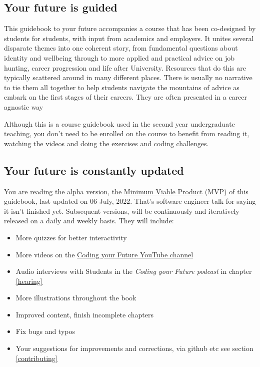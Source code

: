 \documentclass[
]{book}
\providecommand{\tightlist}{%
  \setlength{\itemsep}{0pt}\setlength{\parskip}{0pt}}
\begin{document}
\hypertarget{study}{%
\subsection{Your future is guided}\label{study}}

This guidebook to your future accompanies a course that has been co-designed by students for students, with input from academics and employers. It unites several disparate themes into one coherent story, from fundamental questions about identity and wellbeing through to more applied and practical advice on job hunting, career progression and life after University. Resources that do this are typically scattered around in many different places. There is usually no narrative to tie them all together to help students navigate the mountains of advice as embark on the first stages of their careers. They are often presented in a career agnostic way

Although this is a course guidebook used in the second year undergraduate teaching, you don't need to be enrolled on the course to benefit from reading it, watching the videos and doing the exercises and coding challenges.

\hypertarget{version}{%
\subsection{Your future is constantly updated}\label{version}}

You are reading the alpha version, the \href{https://en.wikipedia.org/wiki/Minimum_viable_product}{Minimum Viable Product} (MVP) of this guidebook, last updated on 06 July, 2022. That's software engineer talk for saying it isn't finished yet. Subsequent versions, will be continuously and iteratively released on a daily and weekly basis. They will include:

\begin{itemize}
\tightlist
\item
  More quizzes for better interactivity
\item
  More videos on the \href{https://www.youtube.com/channel/UCLBv_u8JmyUPqmRALIjVnLg}{Coding your Future YouTube channel}
\item
  Audio interviews with Students in the \emph{Coding your Future podcast} in chapter \ref{hearing}
\item
  More illustrations throughout the book
\item
  Improved content, finish incomplete chapters
\item
  Fix bugs and typos
\item
  Your suggestions for improvements and corrections, via github etc see section \ref{contributing}
\end{itemize}
\end{document}
